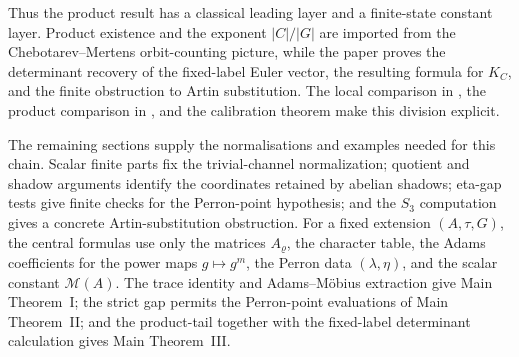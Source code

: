 \documentclass[11pt,a4paper]{amsart}
\theoremstyle{plain}
\theoremstyle{definition}
\theoremstyle{remark}
\begin{document}
Thus the product result has a classical leading layer and a finite-state
constant layer.  Product existence and the exponent \(|C|/|G|\) are imported
from the Chebotarev--Mertens orbit-counting picture, while the paper proves the
determinant recovery of the fixed-label Euler vector, the resulting formula for
\(K_C\), and the finite obstruction to Artin substitution.  The local
comparison in , the product
comparison in , and the calibration theorem
 make this division explicit.

The remaining sections supply the normalisations and examples needed for this
chain.  Scalar finite parts fix the trivial-channel normalization; quotient and
shadow arguments identify the coordinates retained by abelian shadows;
eta-gap tests give finite checks for the Perron-point hypothesis; and the
\(S_3\) computation gives a concrete Artin-substitution obstruction.  For a
fixed extension \((A,\tau,G)\), the central formulas use only the matrices
\(A_\varrho\), the character table, the Adams coefficients for the power maps
\(g\mapsto g^m\), the Perron data \((\lambda,\eta)\), and the scalar constant
\(\mathcal M(A)\).  The trace identity and Adams--M\"obius extraction give Main
Theorem~I; the strict gap permits the Perron-point evaluations of Main
Theorem~II; and the product-tail together with the fixed-label determinant
calculation gives Main Theorem~III.
\end{document}
